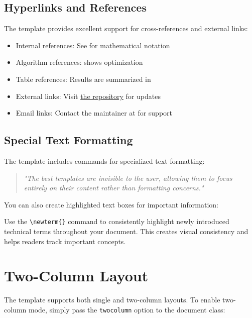 \documentclass{triton}
\begin{document}
\subsection{Hyperlinks and References}

The template provides excellent support for cross-references and external links:

\begin{itemize}
    \item Internal references: See  for mathematical notation
    \item Algorithm references:  shows optimization
    \item Table references: Results are summarized in 
    \item External links: Visit \href{https://github.com/tianyang-liu/triton-template}{the repository} for updates
    \item Email links: Contact the maintainer at  for support
\end{itemize}

\subsection{Special Text Formatting}

The template includes commands for specialized text formatting:

\begin{quote}
\textit{"The best templates are invisible to the user, allowing them to focus entirely on their content rather than formatting concerns."} 
\end{quote}

You can also create highlighted text boxes for important information:

\begin{tcolorbox}[colback=ucsdgold!15,colframe=ucsdgold,title=Pro Tip]
Use the \verb|\newterm{}| command to consistently highlight newly introduced technical terms throughout your document. This creates visual consistency and helps readers track important concepts.
\end{tcolorbox}

\section{Two-Column Layout}

The template supports both single and two-column layouts. To enable two-column mode, simply pass the \texttt{twocolumn} option to the document class:
\end{document}
